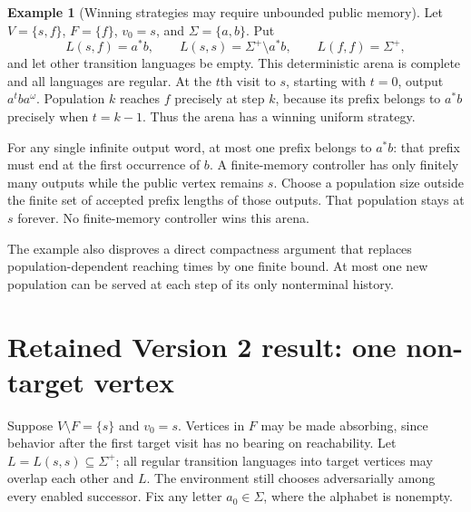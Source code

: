 \documentclass[11pt]{article}
\theoremstyle{definition}
\newtheorem{example}{Example}
\theoremstyle{remark}
\begin{document}
\begin{example}[Winning strategies may require unbounded public memory]
Let $V=\{s,f\}$, $F=\{f\}$, $v_0=s$, and $\Sigma=\{a,b\}$. Put
\[
 L(s,f)=a^*b,\qquad L(s,s)=\Sigma^+\setminus a^*b,
 \qquad L(f,f)=\Sigma^+,
\]
and let other transition languages be empty. This deterministic arena is complete and all languages are regular. At the $t$th visit to $s$, starting with $t=0$, output $a^tba^\omega$. Population $k$ reaches $f$ precisely at step $k$, because its prefix belongs to $a^*b$ precisely when $t=k-1$. Thus the arena has a winning uniform strategy.

For any single infinite output word, at most one prefix belongs to $a^*b$: that prefix must end at the first occurrence of $b$. A finite-memory controller has only finitely many outputs while the public vertex remains $s$. Choose a population size outside the finite set of accepted prefix lengths of those outputs. That population stays at $s$ forever. No finite-memory controller wins this arena.
\end{example}

The example also disproves a direct compactness argument that replaces population-dependent reaching times by one finite bound. At most one new population can be served at each step of its only nonterminal history.


\section{Retained Version 2 result: one non-target vertex}
Suppose $V\setminus F=\{s\}$ and $v_0=s$. Vertices in $F$ may be made
absorbing, since behavior after the first target visit has no bearing on
reachability. Let $L=L(s,s)\subseteq\Sigma^+$; all regular transition
languages into target vertices may overlap each other and $L$.
The environment still chooses adversarially among every enabled successor.
Fix any letter $a_0\in\Sigma$, where the alphabet is nonempty.
\end{document}
